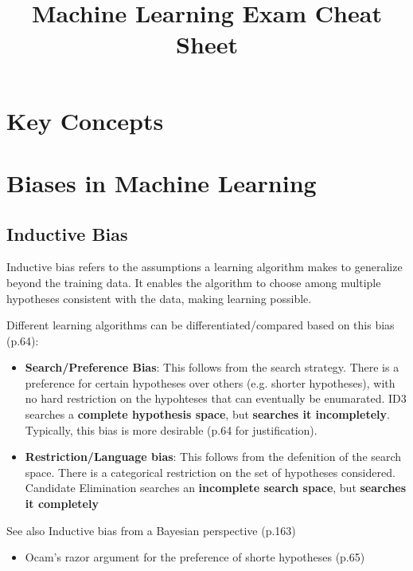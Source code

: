 \documentclass[10pt,a4paper]{article}
\title{Machine Learning Exam Cheat Sheet}
\author{}
\date{}
\begin{document}
\maketitle

\section*{Key Concepts}
\section*{Biases in Machine Learning}

\subsection*{Inductive Bias}
Inductive bias refers to the assumptions a learning algorithm makes to generalize beyond the training data. It enables the algorithm to choose among multiple hypotheses consistent with the data, making learning possible. 

Different learning algorithms can be differentiated/compared based on this bias (p.64):

\begin{itemize}
	\item \textbf{Search/Preference Bias}: This follows from the search strategy. There is a preference for certain hypotheses over others (e.g. shorter hypotheses), with no hard restriction on the hypohteses that can eventually be enumarated. ID3 searches a \textbf{complete hypothesis space}, but  \textbf{searches it incompletely}. Typically, this bias is more desirable (p.64 for justification). 
	
	\item \textbf{Restriction/Language bias}: This follows from the defenition of the search space. There is a categorical restriction on the set of hypotheses considered. Candidate Elimination searches an \textbf{incomplete search space}, but \textbf{searches it completely} 
\end{itemize}

See also Inductive bias from a Bayesian perspective (p.163)
\begin{itemize}
	\item Ocam's razor argument for the preference of shorte hypotheses (p.65)
\end{itemize}


\end{document}
